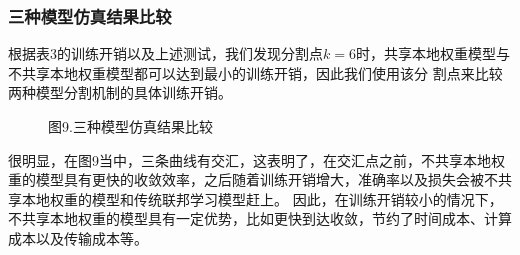 \documentclass{article}
\begin{document}
\subsubsection{三种模型仿真结果比较}
根据表3的训练开销以及上述测试，我们发现分割点$k=6$时，共享本地权重模型与不共享本地权重模型都可以达到最⼩的训练开销，因此我们使⽤该分
割点来⽐较两种模型分割机制的具体训练开销。
\begin{figure}[H]
    \centering
    \caption*{图9.三种模型仿真结果比较}
\end{figure}

很明显，在图9当中，三条曲线有交汇，这表明了，在交汇点之前，不共享本地权重的模型具有更快的收敛效率，之后随着训练开销增大，准确率以及损失会被不共享本地权重的模型和传统联邦学习模型赶上。
因此，在训练开销较小的情况下，不共享本地权重的模型具有一定优势，比如更快到达收敛，节约了时间成本、计算成本以及传输成本等。
\end{document}
